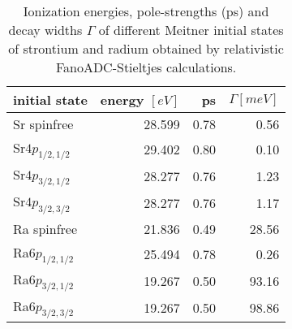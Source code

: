 \begin{table}[htb]
 \centering
 \caption{Ionization energies, pole-strengths (ps) and decay widths $\Gamma$ of
          different Meitner initial states of strontium and radium obtained
          by relativistic FanoADC-Stieltjes calculations.}
 \begin{tabular}{lrrr}
  \toprule
   initial state    & energy $[\unit{eV}]$ & ps & $\Gamma [\unit{meV}]$\\
  \midrule
   Sr spinfree      & 28.599 & 0.78 &   0.56\\  
   Sr$4p_{1/2,1/2}$ & 29.402 & 0.80 &   0.10\\
   Sr$4p_{3/2,1/2}$ & 28.277 & 0.76 &   1.23\\
   Sr$4p_{3/2,3/2}$ & 28.277 & 0.76 &   1.17\\
  \midrule
   Ra spinfree      & 21.836 & 0.49 &  28.56 \\  
   Ra$6p_{1/2,1/2}$ & 25.494 & 0.78 &   0.26\\
   Ra$6p_{3/2,1/2}$ & 19.267 & 0.50 &  93.16 \\
   Ra$6p_{3/2,3/2}$ & 19.267 & 0.50 &  98.86\\
  \bottomrule
 \end{tabular}
 \label{tab:widths}
\end{table}
